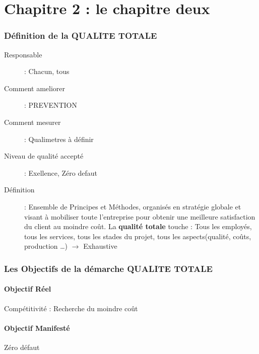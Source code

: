 \part{Chapitre 2 : le chapitre deux}

\section{Définition de la QUALITE TOTALE}

\begin{description}
\item[Responsable] : Chacun, tous
\item[Comment ameliorer] : PREVENTION
\item[Comment mesurer] : Qualimetres à définir
\item[Niveau de qualité accepté] : Exellence, Zéro defaut
\item[Définition] : Ensemble de Principes et Méthodes, organisés en stratégie globale et visant à mobiliser toute l’entreprise pour obtenir une meilleure satisfaction du client au moindre coût. La \textbf{qualité totale} touche : Tous les employés, tous les services, tous les stades du projet, tous les aspects(qualité, coûts, production …) $\rightarrow$ Exhaustive
\end{description}

\section{Les Objectifs de la démarche QUALITE TOTALE}

	\subsection{Objectif Réel}
Compétitivité : Recherche du moindre coût

	\subsection{Objectif Manifesté}
Zéro défaut

